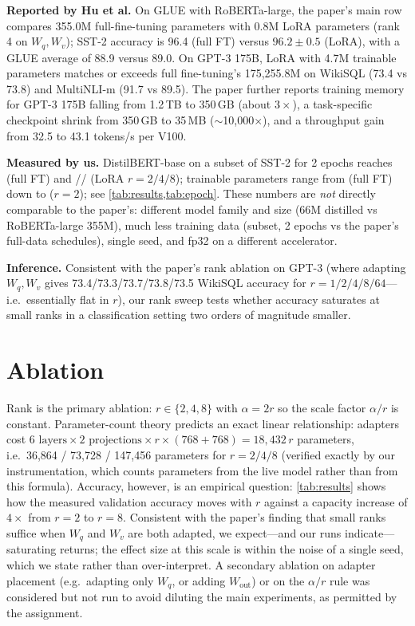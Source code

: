 \documentclass[conference]{IEEEtran}
\begin{document}
\textbf{Reported by Hu et al.} On GLUE with RoBERTa-large, the paper's main row
compares 355.0M full-fine-tuning parameters with 0.8M LoRA parameters (rank 4 on
$W_q,W_v$); SST-2 accuracy is 96.4 (full FT) versus $96.2 \pm 0.5$ (LoRA), with
a GLUE average of 88.9 versus 89.0. On GPT-3 175B, LoRA with 4.7M trainable
parameters matches or exceeds full fine-tuning's 175,255.8M on WikiSQL (73.4
vs 73.8) and MultiNLI-m (91.7 vs 89.5). The paper further reports training
memory for GPT-3 175B falling from 1.2\,TB to 350\,GB (about $3\times$), a
task-specific checkpoint shrink from 350\,GB to 35\,MB ($\sim$10,000$\times$),
and a throughput gain from 32.5 to 43.1 tokens/s per V100.

\textbf{Measured by us.} DistilBERT-base on a \SubsetSize{} subset of SST-2 for
2 epochs reaches \ValFULL{} (full FT) and \ValRTWO{}/\ValRFOUR{}/
\ValREIGHT{} (LoRA $r{=}2/4/8$); trainable parameters range from
\TrainpFULL{} (full FT) down to \TrainpRTWO{} ($r{=}2$); see
\cref{tab:results,tab:epoch}. These numbers are \emph{not} directly comparable
to the paper's: different model family and size (66M distilled vs
RoBERTa-large 355M), much less training data (subset, 2 epochs vs the paper's
full-data schedules), single seed, and fp32 on a different accelerator.

\textbf{Inference.} Consistent with the paper's rank ablation on GPT-3 (where
adapting $W_q,W_v$ gives 73.4/73.3/73.7/73.8/73.5 WikiSQL accuracy for
$r=1/2/4/8/64$---i.e.\ essentially flat in $r$), our rank sweep tests whether
accuracy saturates at small ranks in a classification setting two orders of
magnitude smaller.

\section{Ablation}
\label{sec:ablation}
Rank is the primary ablation: $r \in \{2,4,8\}$ with $\alpha = 2r$ so the scale
factor $\alpha/r$ is constant. Parameter-count theory predicts an exact linear
relationship: adapters cost $6\text{ layers}\times 2\text{ projections}\times
r\times(768+768) = 18{,}432\,r$ parameters, i.e.\ 36,864 / 73,728 / 147,456
parameters for $r=2/4/8$ (verified exactly by our instrumentation, which counts
parameters from the live model rather than from this formula). Accuracy,
however, is an empirical question: \cref{tab:results} shows how the measured
validation accuracy moves with $r$ against a capacity increase of
$4\times$ from $r{=}2$ to $r{=}8$. Consistent with the paper's finding that
small ranks suffice when $W_q$ and $W_v$ are both adapted, we expect---and our
runs indicate---saturating returns; the effect size at this scale is within the
noise of a single seed, which we state rather than over-interpret. A secondary
ablation on adapter placement (e.g.\ adapting only $W_q$, or adding
$W_{\text{out}}$) or on the $\alpha/r$ rule was considered but not run to avoid
diluting the main experiments, as permitted by the assignment.
\end{document}

